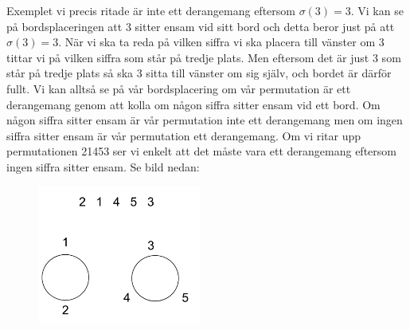 \documentclass[nobib]{tufte-handout}
\begin{document}
\begin{xca2}
\begin{figure}[h]
\end{figure}
Exemplet vi precis ritade är inte ett derangemang eftersom $\sigma(3) = 3$. Vi kan se på bordsplaceringen att 3 sitter ensam vid sitt bord och detta beror just på att $\sigma(3) = 3$. När vi ska ta reda på vilken siffra vi ska placera till vänster om 3 tittar vi på vilken siffra som står på tredje plats. Men eftersom det är just 3 som står på tredje plats så ska 3 sitta till vänster om sig själv, och bordet är därför fullt. Vi kan alltså se på vår bordsplacering om vår permutation är ett derangemang genom att kolla om någon siffra sitter ensam vid ett bord. Om någon siffra sitter ensam är vår permutation inte ett derangemang men om ingen siffra sitter ensam är vår permutation ett derangemang. Om vi ritar upp permutationen 21453 ser vi enkelt att det måste vara ett derangemang eftersom ingen siffra sitter ensam. Se bild nedan:
\begin{figure}[h]
\includegraphics[width=54mm]{ovning_4.2.png}
\end{figure}
\end{xca2}

\bigskip
\end{document}

